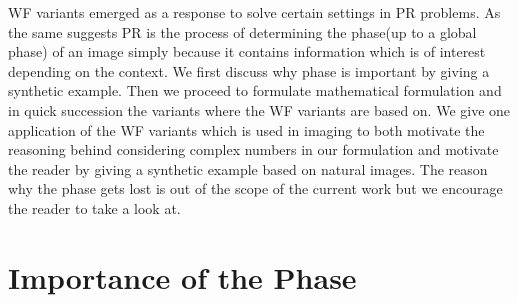 \cite{Wirtinger1927} \cite{KreutzDelgado2009} \cite{Fischer2002}




\ac{WF} variants emerged as a response to solve certain settings in \ac{PR} problems. As the same suggests \ac{PR} is the process of 
determining the phase(up to a global phase) of an image simply because it contains information which is of interest depending on the context. 
We first discuss why phase is important by giving a synthetic example. Then we proceed to formulate mathematical formulation and in quick succession 
the variants where the \ac{WF} variants are based on. We give one application of the \ac{WF} variants which is used in imaging 
to both motivate the reasoning behind considering complex numbers in our formulation and motivate the reader by giving a synthetic example based on 
natural images. The reason why the phase gets lost is out of the scope of the current work but 
we encourage the reader to take a look at\cite{Shechtman2015}\cite{DGDS2018}\cite{FranzSchwabl2007}.

\section{Importance of the Phase}

